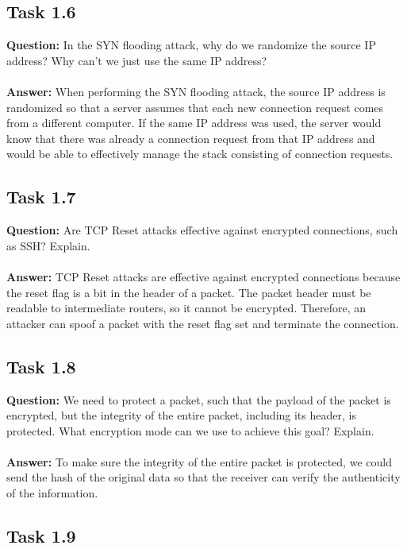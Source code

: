 \documentclass[11pt]{article}
\begin{document}
\subsection*{Task 1.6}

\textbf{Question: } In the SYN flooding attack, why do we randomize the source IP address? Why can’t we just use the same IP address? \\\\
\textbf{Answer: } When performing the SYN flooding attack, the source IP address is randomized so that a server assumes that each new connection request comes from a different computer. If the same IP address was used, the server would know that there was already a connection request from that IP address and would be able to effectively manage the stack consisting of connection requests.

\subsection*{Task 1.7}

\textbf{Question: } Are TCP Reset attacks effective against encrypted connections, such as SSH? Explain. \\\\
\textbf{Answer: } TCP Reset attacks are effective against encrypted connections because the reset flag is a bit in the header of a packet. The packet header must be readable to intermediate routers, so it cannot be encrypted. Therefore, an attacker can spoof a packet with the reset flag set and terminate the connection.

\subsection*{Task 1.8}

\textbf{Question: } We need to protect a packet, such that the payload of the packet is encrypted, but the integrity of the entire packet, including its header, is protected. What encryption mode can we use to achieve this goal? Explain. \\\\
\textbf{Answer: } To make sure the integrity of the entire packet is protected, we could send the hash of the original data so that the receiver can verify the authenticity of the information.

\subsection*{Task 1.9}
\end{document}
